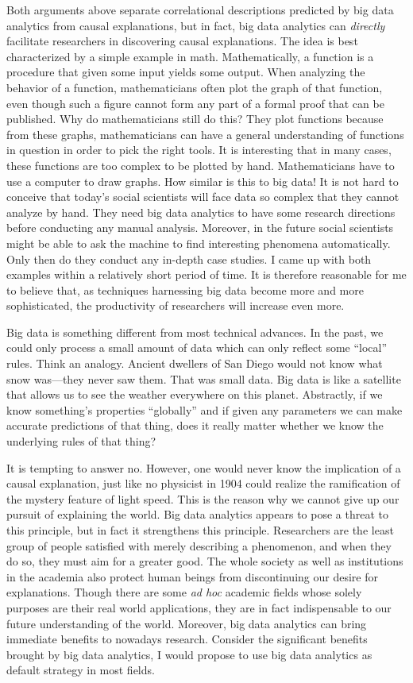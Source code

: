 \documentclass{writing}
\begin{document}
Both arguments above separate correlational descriptions predicted by
big data analytics from causal explanations, but in fact, big data
analytics can \emph{directly} facilitate researchers in discovering
causal explanations. The idea is best characterized by a simple example
in math. Mathematically, a function is a procedure that given some input
yields some output. When analyzing the behavior of a function,
mathematicians often plot the graph of that function, even though such a
figure cannot form any part of a formal proof that can be published. Why
do mathematicians still do this? They plot functions because from these
graphs, mathematicians can have a general understanding of functions in
question in order to pick the right tools. It is interesting that in
many cases, these functions are too complex to be plotted by hand.
Mathematicians have to use a computer to draw graphs. How similar is
this to big data! It is not hard to conceive that today's social
scientists will face data so complex that they cannot analyze by hand.
They need big data analytics to have some research directions before
conducting any manual analysis. Moreover, in the future social
scientists might be able to ask the machine to find interesting
phenomena automatically. Only then do they conduct any in-depth case
studies. I came up with both examples within a relatively short period
of time. It is therefore reasonable for me to believe that, as
techniques harnessing big data become more and more sophisticated, the
productivity of researchers will increase even more.

Big data is something different from most technical advances. In the
past, we could only process a small amount of data which can only
reflect some ``local'' rules. Think an analogy. Ancient dwellers of San
Diego would not know what snow was---they never saw them. That was small
data. Big data is like a satellite that allows us to see the weather
everywhere on this planet. Abstractly, if we know something's properties
``globally'' and if given any parameters we can make accurate
predictions of that thing, does it really matter whether we know the
underlying rules of that thing?

It is tempting to answer no. However, one would never know the
implication of a causal explanation, just like no physicist in 1904
could realize the ramification of the mystery feature of light speed.
This is the reason why we cannot give up our pursuit of explaining the
world. Big data analytics appears to pose a threat to this principle,
but in fact it strengthens this principle. Researchers are the least
group of people satisfied with merely describing a phenomenon, and when
they do so, they must aim for a greater good. The whole society as well
as institutions in the academia also protect human beings from
discontinuing our desire for explanations. Though there are some
\emph{ad hoc} academic fields whose solely purposes are their real world
applications, they are in fact indispensable to our future understanding
of the world. Moreover, big data analytics can bring immediate benefits
to nowadays research. Consider the significant benefits brought by big
data analytics, I would propose to use big data analytics as default
strategy in most fields.
\end{document}
